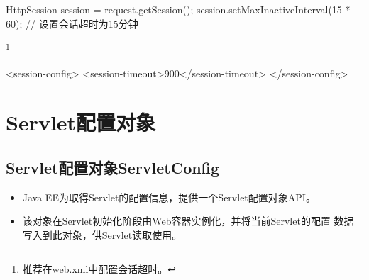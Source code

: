 \begin{javaCode}
  HttpSession session = request.getSession();
  session.setMaxInactiveInterval(15 * 60); // 设置会话超时为15分钟
\end{javaCode}

\footnote{推荐在web.xml中配置会话超时。}

\begin{xmlCode}
  <session-config>
  <session-timeout>900</session-timeout>
  </session-config>
\end{xmlCode}


\section{Servlet配置对象}

\subsection{Servlet配置对象ServletConfig}

\begin{itemize}
\item Java EE为取得Servlet的配置信息，提供一个Servlet配置对象API。
\item 该对象在Servlet初始化阶段由Web容器实例化，并将当前Servlet的配置
  数据写入到此对象，供Servlet读取使用。
\end{itemize}

